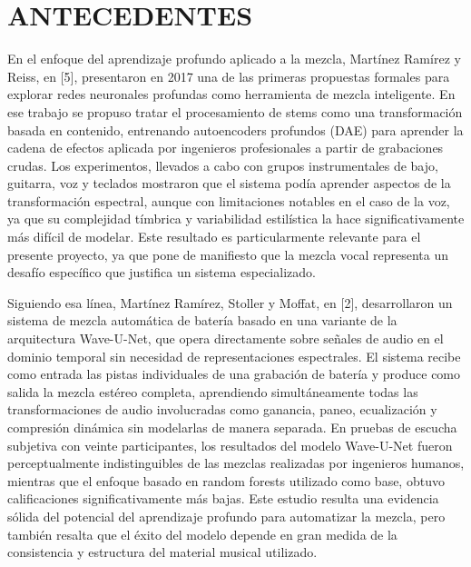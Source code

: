 \section{ANTECEDENTES}
En el enfoque del aprendizaje profundo aplicado a la mezcla, Martínez Ramírez y Reiss, en [5], presentaron en 2017 una de las primeras propuestas formales para explorar redes neuronales profundas como herramienta de mezcla inteligente. En ese trabajo se propuso tratar el procesamiento de stems como una transformación basada en contenido, entrenando autoencoders profundos (DAE) para aprender la cadena de efectos aplicada por ingenieros profesionales a partir de grabaciones crudas. Los experimentos, llevados a cabo con grupos instrumentales de bajo, guitarra, voz y teclados mostraron que el sistema podía aprender aspectos de la transformación espectral, aunque con limitaciones notables en el caso de la voz, ya que su complejidad tímbrica y variabilidad estilística la hace significativamente más difícil de modelar. Este resultado es particularmente relevante para el presente proyecto, ya que pone de manifiesto que la mezcla vocal representa un desafío específico que justifica un sistema especializado.

Siguiendo esa línea, Martínez Ramírez, Stoller y Moffat, en [2], desarrollaron un sistema de mezcla automática de batería basado en una variante de la arquitectura Wave-U-Net, que opera directamente sobre señales de audio en el dominio temporal sin necesidad de representaciones espectrales. El sistema recibe como entrada las pistas individuales de una grabación de batería y produce como salida la mezcla estéreo completa, aprendiendo simultáneamente todas las transformaciones de audio involucradas como ganancia, paneo, ecualización y compresión dinámica sin modelarlas de manera separada. En pruebas de escucha subjetiva con veinte participantes, los resultados del modelo Wave-U-Net fueron perceptualmente indistinguibles de las mezclas realizadas por ingenieros humanos, mientras que el enfoque basado en random forests utilizado como base, obtuvo calificaciones significativamente más bajas. Este estudio resulta una evidencia sólida del potencial del aprendizaje profundo para automatizar la mezcla, pero también resalta que el éxito del modelo depende en gran medida de la consistencia y estructura del material musical utilizado.

